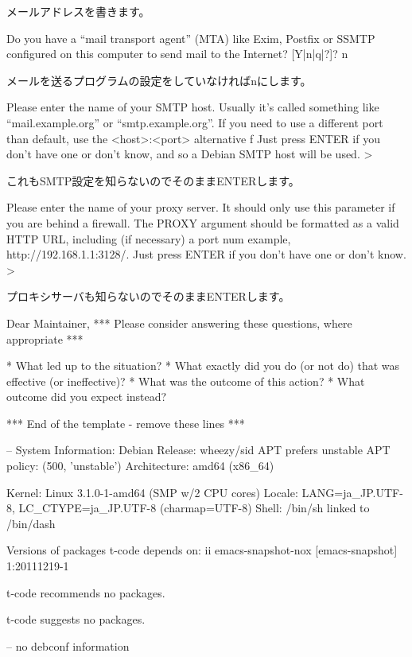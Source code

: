 \documentclass[mingoth,a4paper]{jsarticle}
\begin{document}
メールアドレスを書きます。

\begin{commandline}
Do you have a ``mail transport agent'' (MTA) like Exim, Postfix or SSMTP configured on this computer to send mail
 to the Internet? [Y|n|q|?]? n
\end{commandline}

メールを送るプログラムの設定をしていなければnにします。

\begin{commandline}
Please enter the name of your SMTP host. Usually it's called something like ``mail.example.org'' or
 ``smtp.example.org''. If you need to use a different port than default, use the <host>:<port> alternative f
Just press ENTER if you don't have one or don't know, and so a Debian SMTP host will be used.
>
\end{commandline}

これもSMTP設定を知らないのでそのままENTERします。

\begin{commandline}
Please enter the name of your proxy server. It should only use this parameter if you are behind a firewall.
 The PROXY argument should be formatted as a valid HTTP URL, including (if necessary) a port num
example, http://192.168.1.1:3128/. Just press ENTER if you don't have one or don't know.
>
\end{commandline}

プロキシサーバも知らないのでそのままENTERします。

\begin{commandline}
Dear Maintainer,
*** Please consider answering these questions, where appropriate ***

   * What led up to the situation?
   * What exactly did you do (or not do) that was effective (or
     ineffective)?
   * What was the outcome of this action?
   * What outcome did you expect instead?

*** End of the template - remove these lines ***


-- System Information:
Debian Release: wheezy/sid
  APT prefers unstable
  APT policy: (500, 'unstable')
Architecture: amd64 (x86_64)

Kernel: Linux 3.1.0-1-amd64 (SMP w/2 CPU cores)
Locale: LANG=ja_JP.UTF-8, LC_CTYPE=ja_JP.UTF-8 (charmap=UTF-8)
Shell: /bin/sh linked to /bin/dash

Versions of packages t-code depends on:
ii  emacs-snapshot-nox [emacs-snapshot]  1:20111219-1

t-code recommends no packages.

t-code suggests no packages.

-- no debconf information
\end{commandline}
\end{document}
